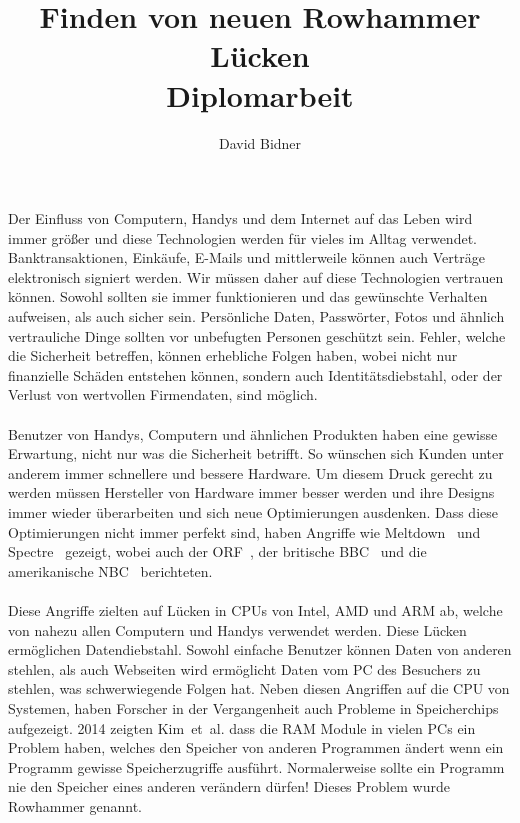 \documentclass[a4paper]{article}
\title{Finden von neuen Rowhammer Lücken \\ \vspace{+2ex}\small{Diplomarbeit}}
\author{David Bidner}
\date{\vspace{-5ex}}
\newcommand{\etal}{et~al. }
\begin{document}
\maketitle

Der Einfluss von Computern, Handys und dem Internet auf das Leben wird immer
größer und diese Technologien werden für vieles im Alltag verwendet.
Banktransaktionen, Einkäufe, E-Mails und mittlerweile können auch Verträge
elektronisch signiert werden. Wir müssen daher auf diese Technologien vertrauen
können. Sowohl sollten sie immer funktionieren und das gewünschte Verhalten
aufweisen, als auch sicher sein. Persönliche Daten, Passwörter, Fotos und
ähnlich vertrauliche Dinge sollten vor unbefugten Personen geschützt sein.
Fehler, welche die Sicherheit betreffen, können erhebliche Folgen haben, wobei
nicht nur finanzielle Schäden entstehen können, sondern auch
Identitätsdiebstahl, oder der Verlust von wertvollen Firmendaten, sind möglich.

\paragraph{}

Benutzer von Handys, Computern und ähnlichen Produkten haben eine gewisse
Erwartung, nicht nur was die Sicherheit betrifft. So wünschen sich Kunden unter
anderem immer schnellere und bessere Hardware. Um diesem Druck gerecht zu werden
müssen Hersteller von Hardware immer besser werden und ihre Designs immer wieder
überarbeiten und sich neue Optimierungen ausdenken. Dass diese Optimierungen
nicht immer perfekt sind, haben Angriffe wie Meltdown~\cite{meltdown}
und Spectre~\cite{spectre} gezeigt, wobei auch der ORF~\cite{orfmeltdown}, der
britische BBC~\cite{bbcmeltdown} und die amerikanische NBC~\cite{nbcmeltdown}
berichteten.

\paragraph{}

Diese Angriffe zielten auf Lücken in CPUs von Intel, AMD und ARM ab, welche
von nahezu allen Computern und Handys verwendet werden. Diese Lücken
ermöglichen Datendiebstahl. Sowohl einfache Benutzer können Daten von anderen
stehlen, als auch Webseiten wird ermöglicht Daten vom PC des Besuchers zu
stehlen, was schwerwiegende Folgen hat. Neben diesen Angriffen auf die CPU
von Systemen, haben Forscher in der Vergangenheit auch Probleme in
Speicherchips aufgezeigt. 2014 zeigten Kim~\etal\cite{rowhammergeneral} dass
die RAM Module in vielen PCs ein Problem haben, welches den Speicher von anderen
Programmen ändert wenn ein Programm gewisse Speicherzugriffe ausführt.
Normalerweise sollte ein Programm nie den Speicher eines anderen verändern
dürfen! Dieses Problem wurde Rowhammer genannt.
\end{document}
